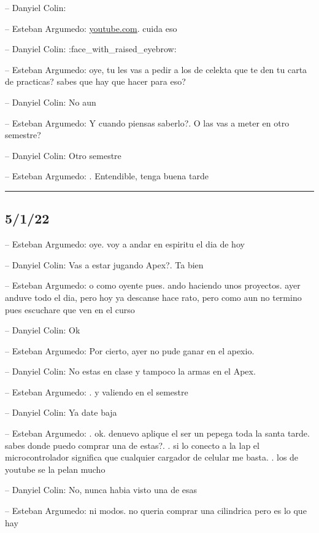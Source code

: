 -- Danyiel Colin:

-- Esteban Argumedo:
\href{https://www.youtube.com/watch?v=ztrsc_MPFWQ}{youtube.com}. cuida
eso

-- Danyiel Colin: :face\_with\_raised\_eyebrow:

-- Esteban Argumedo: oye, tu les vas a pedir a los de celekta que te den
tu carta de practicas? sabes que hay que hacer para eso?

-- Danyiel Colin: No aun

-- Esteban Argumedo: Y cuando piensas saberlo?. O las vas a meter en
otro semestre?

-- Danyiel Colin: Otro semestre

-- Esteban Argumedo: . Entendible, tenga buena tarde

\begin{center}\rule{0.5\linewidth}{0.5pt}\end{center}

\hypertarget{section-66}{%
\subsection{5/1/22}\label{section-66}}

-- Esteban Argumedo: oye. voy a andar en espiritu el dia de hoy

-- Danyiel Colin: Vas a estar jugando Apex?. Ta bien

-- Esteban Argumedo: o como oyente pues. ando haciendo unos proyectos.
ayer anduve todo el dia, pero hoy ya descanse hace rato, pero como aun
no termino pues escuchare que ven en el curso

-- Danyiel Colin: Ok

-- Esteban Argumedo: Por cierto, ayer no pude ganar en el apexio.

-- Danyiel Colin: No estas en clase y tampoco la armas en el Apex.

-- Esteban Argumedo: . y valiendo en el semestre

-- Danyiel Colin: Ya date baja

-- Esteban Argumedo: . ok. denuevo aplique el ser un pepega toda la
santa tarde. sabes donde puedo comprar una de estas?. . si lo conecto a
la lap el microcontrolador significa que cualquier cargador de celular
me basta. . los de youtube se la pelan mucho

-- Danyiel Colin: No, nunca habia visto una de esas

-- Esteban Argumedo: ni modos. no queria comprar una cilindrica pero es
lo que hay

